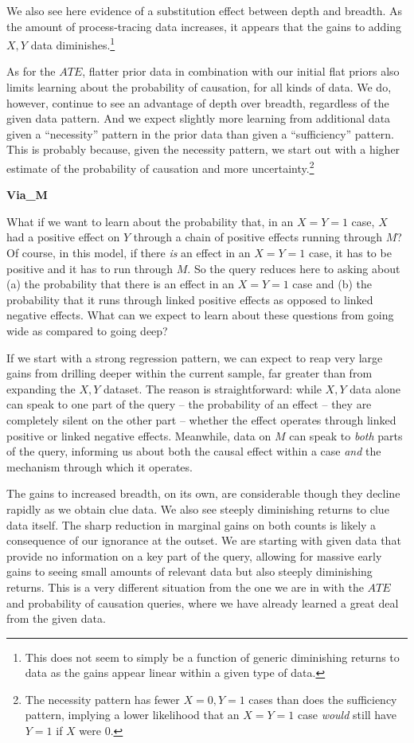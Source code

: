 \documentclass[
  12pt,
]{book}
\begin{document}
We also see here evidence of a substitution effect between depth and breadth. As the amount of process-tracing data increases, it appears that the gains to adding \(X,Y\) data diminishes.\footnote{This does not seem to simply be a function of generic diminishing returns to data as the gains appear linear within a given type of data.}

As for the \(ATE\), flatter prior data in combination with our initial flat priors also limits learning about the probability of causation, for all kinds of data. We do, however, continue to see an advantage of depth over breadth, regardless of the given data pattern. And we expect slightly more learning from additional data given a ``necessity'' pattern in the prior data than given a ``sufficiency'' pattern. This is probably because, given the necessity pattern, we start out with a higher estimate of the probability of causation and more uncertainty.\footnote{The necessity pattern has fewer \(X=0, Y=1\) cases than does the sufficiency pattern, implying a lower likelihood that an \(X=Y=1\) case \emph{would} still have \(Y=1\) if \(X\) were 0.}

\textbf{Via\_M}

What if we want to learn about the probability that, in an \(X=Y=1\) case, \(X\) had a positive effect on \(Y\) through a chain of positive effects running through \(M\)? Of course, in this model, if there \emph{is} an effect in an \(X=Y=1\) case, it has to be positive and it has to run through \(M\). So the query reduces here to asking about (a) the probability that there is an effect in an \(X=Y=1\) case and (b) the probability that it runs through linked positive effects as opposed to linked negative effects. What can we expect to learn about these questions from going wide as compared to going deep?

If we start with a strong regression pattern, we can expect to reap very large gains from drilling deeper within the current sample, far greater than from expanding the \(X,Y\) dataset. The reason is straightforward: while \(X,Y\) data alone can speak to one part of the query -- the probability of an effect -- they are completely silent on the other part -- whether the effect operates through linked positive or linked negative effects. Meanwhile, data on \(M\) can speak to \emph{both} parts of the query, informing us about both the causal effect within a case \emph{and} the mechanism through which it operates.

The gains to increased breadth, on its own, are considerable though they decline rapidly as we obtain clue data. We also see steeply diminishing returns to clue data itself. The sharp reduction in marginal gains on both counts is likely a consequence of our ignorance at the outset. We are starting with given data that provide no information on a key part of the query, allowing for massive early gains to seeing small amounts of relevant data but also steeply diminishing returns. This is a very different situation from the one we are in with the \(ATE\) and probability of causation queries, where we have already learned a great deal from the given data.
\end{document}
